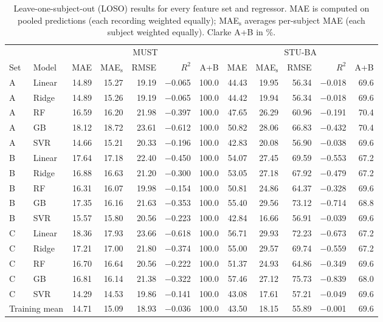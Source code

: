 \begin{table}[htbp]\centering\small
\caption{Leave-one-subject-out (LOSO) results for every feature set and regressor. MAE is computed on pooled predictions (each recording weighted equally); MAE$_\mathrm{s}$ averages per-subject MAE (each subject weighted equally). Clarke A+B in \%.}\label{tab:s1}
\begin{tabular}{llrrrrr|rrrrr}\hline
&&\multicolumn{5}{c|}{MUST}&\multicolumn{5}{c}{STU-BA}\\
Set&Model&MAE&MAE$_\mathrm{s}$&RMSE&$R^2$&A+B&MAE&MAE$_\mathrm{s}$&RMSE&$R^2$&A+B\\\hline
A&Linear&14.89&15.27&19.19&$-$0.065&100.0&44.43&19.95&56.34&$-$0.018&69.6\\
A&Ridge&14.89&15.26&19.19&$-$0.065&100.0&44.42&19.94&56.34&$-$0.018&69.6\\
A&RF&16.59&16.20&21.98&$-$0.397&100.0&47.65&26.29&60.96&$-$0.191&70.4\\
A&GB&18.12&18.72&23.61&$-$0.612&100.0&50.82&28.06&66.83&$-$0.432&70.4\\
A&SVR&14.66&15.21&20.33&$-$0.196&100.0&42.83&20.08&56.90&$-$0.038&69.6\\
B&Linear&17.64&17.18&22.40&$-$0.450&100.0&54.07&27.45&69.59&$-$0.553&67.2\\
B&Ridge&16.88&16.63&21.20&$-$0.300&100.0&53.05&27.18&67.92&$-$0.479&67.2\\
B&RF&16.31&16.07&19.98&$-$0.154&100.0&50.81&24.86&64.37&$-$0.328&69.6\\
B&GB&17.35&16.16&21.63&$-$0.353&100.0&55.40&29.56&73.12&$-$0.714&68.8\\
B&SVR&15.57&15.80&20.56&$-$0.223&100.0&42.84&16.66&56.91&$-$0.039&69.6\\
C&Linear&18.36&17.93&23.66&$-$0.618&100.0&56.71&29.93&72.23&$-$0.673&67.2\\
C&Ridge&17.21&17.00&21.80&$-$0.374&100.0&55.00&29.57&69.74&$-$0.559&67.2\\
C&RF&16.70&16.64&20.56&$-$0.222&100.0&51.37&24.93&64.86&$-$0.349&69.6\\
C&GB&16.81&16.14&21.38&$-$0.322&100.0&57.46&27.12&75.73&$-$0.839&68.0\\
C&SVR&14.29&14.53&19.86&$-$0.141&100.0&43.08&17.61&57.21&$-$0.049&69.6\\
\hline\multicolumn{2}{l}{Training mean}&14.71&15.09&18.93&$-$0.036&100.0&43.50&18.15&55.89&$-$0.001&69.6\\\hline\end{tabular}\end{table}
